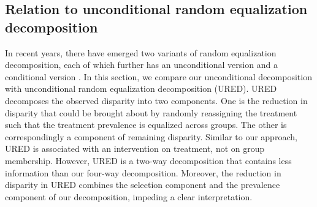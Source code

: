 \documentclass[12pt,a4paper]{article}
\begin{document}
\subsection{Relation to unconditional random equalization decomposition}
In recent years, there have emerged two variants of random equalization decomposition, each of which further has an unconditional version and a conditional version \citep{vanderweele_causal_2014, jackson_decomposition_2018, sudharsanan_educational_2021, lundberg_gap-closing_2022,park_sensitivity_2023}. In this section, we compare our unconditional decomposition with unconditional random equalization decomposition (URED). URED decomposes the observed disparity into two components. One is the reduction in disparity that could be brought about by randomly reassigning the treatment such that the treatment prevalence is equalized across groups. The other is correspondingly a component of remaining disparity. Similar to our approach, URED is associated with an intervention on treatment, not on group membership. However, URED is a two-way decomposition that contains less information than our four-way decomposition. Moreover, the reduction in disparity in URED combines the selection component and the prevalence component of our decomposition, impeding a clear interpretation.

\end{document}
